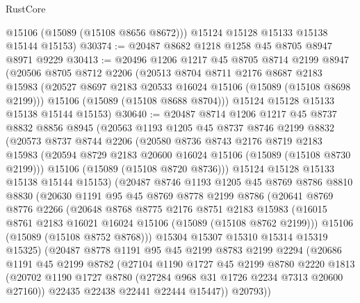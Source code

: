 \begin{lexlean}{RustCore}
\begin{coremodule}
        @15106
        (@15089 (@15108 @8656 @8672)))
      @15124
      @15128
      @15133
      @15138
      @15144
      @15153)
@30374 := @20487 @8682 @1218 @1258 @45 @8705 @8947 @8971 @9229
@30413 := @20496
    @1206
    @1217
    @45
    @8705
    @8714
    @2199
    @8947
    (@20506
      @8705
      @8712
      @2206
      (@20513
        @8704
        @8711
        @2176
        @8687
        @2183
        @15983
        (@20527 @8697 @2183 @20533 @16024 @15106 (@15089 (@15108 @8698 @2199)))
        @15106
        (@15089 (@15108 @8688 @8704)))
      @15124
      @15128
      @15133
      @15138
      @15144
      @15153)
@30640 := @20487
    @8714
    @1206
    @1217
    @45
    @8737
    @8832
    @8856
    @8945
    (@20563
      @1193
      @1205
      @45
      @8737
      @8746
      @2199
      @8832
      (@20573
        @8737
        @8744
        @2206
        (@20580
          @8736
          @8743
          @2176
          @8719
          @2183
          @15983
          (@20594 @8729 @2183 @20600 @16024 @15106 (@15089 (@15108 @8730 @2199)))
          @15106
          (@15089 (@15108 @8720 @8736)))
        @15124
        @15128
        @15133
        @15138
        @15144
        @15153)
      (@20487
        @8746
        @1193
        @1205
        @45
        @8769
        @8786
        @8810
        @8830
        (@20630
          @1191
          @95
          @45
          @8769
          @8778
          @2199
          @8786
          (@20641
            @8769
            @8776
            @2266
            (@20648
              @8768
              @8775
              @2176
              @8751
              @2183
              @15983
              (@16015 @8761 @2183 @16021 @16024 @15106 (@15089 (@15108 @8762 @2199)))
              @15106
              (@15089 (@15108 @8752 @8768)))
            @15304
            @15307
            @15310
            @15314
            @15319
            @15325)
          (@20487
            @8778
            @1191
            @95
            @45
            @2199
            @8783
            @2199
            @2294
            (@20686
              @1191
              @45
              @2199
              @8782
              (@27104
                @1190
                @1727
                @45
                @2199
                @8780
                @2220
                @1813
                (@20702 @1190 @1727 @8780 (@27284 @968 @31 @1726 @2234 @7313 @20600 @27160))
                @22435
                @22438
                @22441
                @22444
                @15447))
            @20793))

\end{coremodule}
\end{lexlean}
